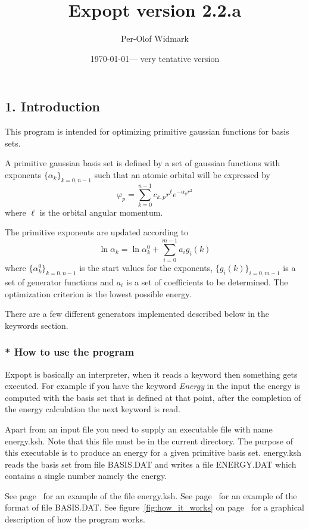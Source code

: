 \documentclass[a4paper,fleqn]{article}
\title{Expopt version 2.2.a}
\author{Per-Olof Widmark}
\date{\today --- very tentative version}
\let\headi=\subsection
\let\headii=\subsubsection
\def\file#1{{\sffamily\upshape\mdseries #1}}
\def\kwd#1{{\mdseries\sffamily\slshape\mdseries #1}}
\begin{document}
\maketitle
\headi{1. Introduction}
This program is intended for optimizing primitive gaussian functions
for basis sets.

A primitive gaussian basis set is defined by a set of gaussian functions with
exponents $\{\alpha_k\}_{k=0,n-1}$ such that an atomic orbital will be expressed by
\begin{equation}
\varphi_p=\sum_{k=0}^{n-1} c_{k,p} r^\ell e^{-\alpha_k r^2}
\end{equation}
where $\ell$ is the orbital angular momentum.

The primitive exponents are updated according to
\begin{equation}
\ln\alpha_k = \ln\alpha_k^0 + \sum_{i=0}^{m-1} a_i g_i(k)
\end{equation}
where $\{\alpha_k^0\}_{k=0,n-1}$ is the start values for the exponents,
$\{g_i(k)\}_{i=0,m-1}$ is a set of generator functions and
$a_i$ is a set of coefficients to be determined.
The optimization criterion is the lowest possible energy.

There are a few different generators implemented described below in the
keywords section.
\headii{* How to use the program}
Expopt is basically an interpreter, when it reads a keyword then something
gets executed. For example if you have the keyword \kwd{Energy} in the input
the energy is computed with the basis set that is defined at that point, after
the completion of the energy calculation the next keyword is read.

Apart from an input file you need to supply an executable file with name \file{energy.ksh}.
Note that this file must be in the current directory. The purpose of this
executable is to produce an energy for a given primitive basis set.
\file{energy.ksh} reads the basis set from file \file{BASIS.DAT}
and writes a file \file{ENERGY.DAT} which contains a single number
namely the energy.

See page~\pageref{sec:energy.ksh} for an example of the file \file{energy.ksh}.
See page~\pageref{sec:basis.dat} for an example of the format of file \file{BASIS.DAT}.
See figure~\ref{fig:how_it_works} on page~\pageref{fig:how_it_works} for a graphical
description of how the program works.
\end{document}
